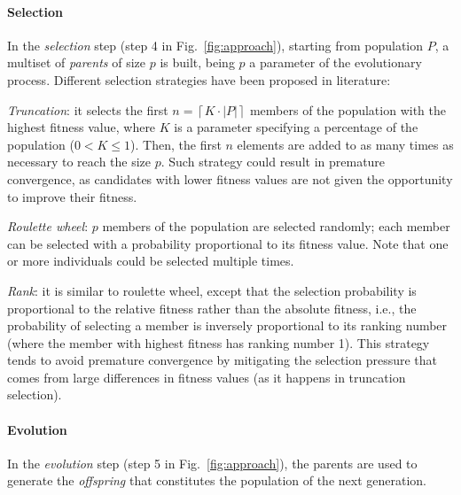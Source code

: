 \begin{tikzborder}{\cite{Gargantini16:validation}}
\begin{tikzborder}{\cite{gargantini_combinatorial_2017}}
\begin{tikzborder}{\cite{garn2019}}
\begin{tikzborder}{\cite{arcaini2019achieving}}
	\paragraph{\bf Selection}%
	\bb In the \emph{selection} step (step 4 in Fig.~\ref{fig:approach}), starting from population $P$, a multiset of \emph{parents} \PAR of size $p$ is built, being $p$ a parameter of the evolutionary process. Different selection strategies have been proposed in literature:
	\begin{compactitem}
		\item \emph{Truncation}: it selects the first $n = \left\lceil K\cdot|P| \right\rceil$ members of the population with the highest fitness value, where $K$ is a parameter specifying a percentage of the population ($0 < K \le 1$). Then, the first $n$ elements are added to \PAR as many times as necessary to reach the size $p$. Such strategy could result in premature convergence, as candidates with lower fitness values are not given the opportunity to improve their fitness.
		\item \emph{Roulette wheel}: $p$ members of the population are selected randomly; each member can be selected with a probability proportional to its fitness value. Note that one or more individuals could be selected multiple times.
		\item \emph{Rank}: it is similar to roulette wheel, except that the selection probability is proportional to the relative fitness rather than the absolute fitness, i.e., the probability of selecting a member is inversely proportional to its ranking number (where the member with highest fitness has ranking number 1). This strategy tends to avoid premature convergence by mitigating the selection pressure that comes from large differences in fitness values (as it happens in truncation selection).
	\end{compactitem}\be
	
	\paragraph{\bf Evolution}%
	\bb In the \emph{evolution} step (step 5 in Fig.~\ref{fig:approach}), the parents \PAR are used to generate the \emph{offspring} that constitutes the population of the next generation.
	

\end{tikzborder}
\end{tikzborder}
\end{tikzborder}
\end{tikzborder}
